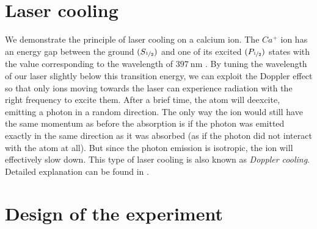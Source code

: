 \section{Laser cooling}
We demonstrate the principle of laser cooling on a calcium ion. The $Ca^+$ ion has an energy gap between the ground $(S_{\nicefrac{1}{2}})$ and one of its excited $(P_{\nicefrac{1}{2}})$ states with the value corresponding to the wavelength of $\SI{397}{\nano\meter}$ \cite{urabe1993laser}. By tuning the wavelength of our laser slightly below this transition energy, we can exploit the Doppler effect so that only ions moving towards the laser can experience radiation with the right frequency to excite them. After a brief time, the atom will deexcite, emitting a photon in a random direction. The only way the ion would still have the same momentum as before the absorption is if the photon was emitted exactly in the same direction as it was absorbed (as if the photon did not interact with the atom at all). But since the photon emission is isotropic, the ion will effectively slow down. This type of laser cooling is also known as \emph{Doppler cooling}. Detailed explanation can be found in \cite{alma990008711500106986}.   

\section{Design of the experiment}

